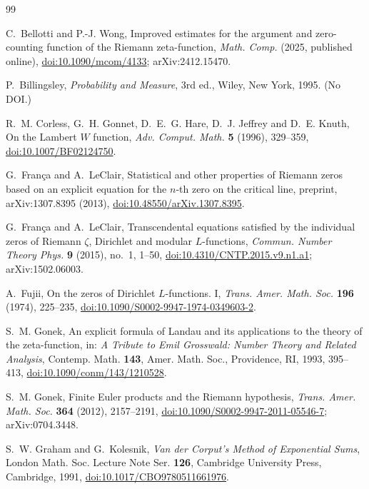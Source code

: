 \documentclass[11pt,reqno]{amsart}
\theoremstyle{plain}\newtheorem{theorem}{Theorem}[section]\newtheorem{proposition}[theorem]{Proposition}\newtheorem{lemma}[theorem]{Lemma}\newtheorem{corollary}[theorem]{Corollary}
\theoremstyle{definition}\newtheorem{hypothesis}[theorem]{Hypothesis}\newtheorem{definition}[theorem]{Definition}
\theoremstyle{remark}\newtheorem{remark}[theorem]{Remark}\newtheorem{experiment}[theorem]{Experiment}\newtheorem{question}[theorem]{Question}\newtheorem{heuristic}[theorem]{Heuristic}\newtheorem{conjecture}[theorem]{Conjecture}
\begin{document}
\begin{thebibliography}{99}

C.~Bellotti and P.-J. Wong, Improved estimates for the argument and zero-counting function of the Riemann zeta-function, \emph{Math. Comp.} (2025, published online), \href{https://doi.org/10.1090/mcom/4133}{doi:10.1090/mcom/4133}; arXiv:2412.15470.

P.~Billingsley, \emph{Probability and Measure}, 3rd ed., Wiley, New York, 1995. (No DOI.)

R.~M. Corless, G.~H. Gonnet, D.~E.~G. Hare, D.~J. Jeffrey and D.~E. Knuth, On the Lambert $W$ function, \emph{Adv. Comput. Math.} \textbf{5} (1996), 329--359, \href{https://doi.org/10.1007/BF02124750}{doi:10.1007/BF02124750}.

G.~Fran\c{c}a and A.~LeClair, Statistical and other properties of Riemann zeros based on an explicit equation for the $n$-th zero on the critical line, preprint, arXiv:1307.8395 (2013), \href{https://doi.org/10.48550/arXiv.1307.8395}{doi:10.48550/arXiv.1307.8395}.

G.~Fran\c{c}a and A.~LeClair, Transcendental equations satisfied by the individual zeros of Riemann $\zeta$, Dirichlet and modular $L$-functions, \emph{Commun. Number Theory Phys.} \textbf{9} (2015), no.~1, 1--50, \href{https://doi.org/10.4310/CNTP.2015.v9.n1.a1}{doi:10.4310/CNTP.2015.v9.n1.a1}; arXiv:1502.06003.

A.~Fujii, On the zeros of Dirichlet $L$-functions. I, \emph{Trans. Amer. Math. Soc.} \textbf{196} (1974), 225--235, \href{https://doi.org/10.1090/S0002-9947-1974-0349603-2}{doi:10.1090/S0002-9947-1974-0349603-2}.

S.~M. Gonek, An explicit formula of Landau and its applications to the theory of the zeta-function, in: \emph{A Tribute to Emil Grosswald: Number Theory and Related Analysis}, Contemp. Math. \textbf{143}, Amer. Math. Soc., Providence, RI, 1993, 395--413, \href{https://doi.org/10.1090/conm/143/1210528}{doi:10.1090/conm/143/1210528}.

S.~M. Gonek, Finite Euler products and the Riemann hypothesis, \emph{Trans. Amer. Math. Soc.} \textbf{364} (2012), 2157--2191, \href{https://doi.org/10.1090/S0002-9947-2011-05546-7}{doi:10.1090/S0002-9947-2011-05546-7}; arXiv:0704.3448.

S.~W. Graham and G.~Kolesnik, \emph{Van der Corput's Method of Exponential Sums}, London Math. Soc. Lecture Note Ser. \textbf{126}, Cambridge University Press, Cambridge, 1991, \href{https://doi.org/10.1017/CBO9780511661976}{doi:10.1017/CBO9780511661976}.


\end{thebibliography}
\end{document}

